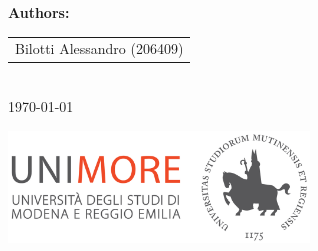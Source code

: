 \begin{titlepage}
    {\Large \textbf{\textcolor{tudelftdarkblue}{Authors:}}}\\[0.5cm]
    \begin{tabular}{c}
        \Large \textcolor{tudelftdarkblue}{Bilotti Alessandro (206409)}
    \end{tabular}\\[2cm]
    
    {\Large \textcolor{tudelftdarkblue}{\today}}
    
    \vfill
    \begin{center}
        \includegraphics[width=0.6\textwidth]{images/Logo_C_Positivo_Colore.png}
    \end{center}
\end{titlepage}